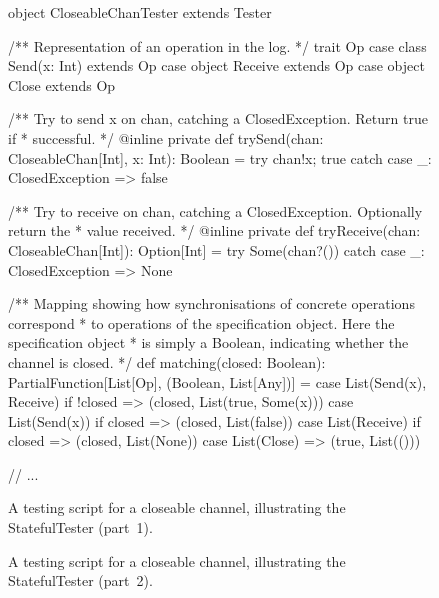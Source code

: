\begin{figure}
\begin{scala}
object CloseableChanTester extends Tester{
  /** Representation of an operation in the log. */
  trait Op
  case class Send(x: Int) extends Op
  case object Receive extends Op
  case object Close extends Op

  /** Try to send x on chan, catching a ClosedException.  Return true if
    * successful. */ 
  @inline private def trySend(chan: CloseableChan[Int], x: Int): Boolean = 
    try{ chan!x; true } catch { case _: ClosedException => false }

  /** Try to receive on chan, catching a ClosedException.  Optionally return the
    * value received. */ 
  @inline private def tryReceive(chan: CloseableChan[Int]): Option[Int] = 
    try{ Some(chan?()) } catch { case _: ClosedException => None }

  /** Mapping showing how synchronisations of concrete operations correspond 
    * to operations of the specification object.  Here the specification object
    * is simply a Boolean, indicating whether the channel is closed.  */
  def matching(closed: Boolean): PartialFunction[List[Op], (Boolean, List[Any])] = {
    case List(Send(x), Receive) if !closed => (closed, List(true, Some(x)))
    case List(Send(x)) if closed => (closed, List(false))
    case List(Receive) if closed => (closed, List(None))
    case List(Close) => (true, List(()))
  }

  // ...
}
\end{scala}
\caption{A testing script for a closeable channel, illustrating the {\scalashape
    Stateful\-Tester} (part~1).\label{fig:closable-chan-1}} 
\end{figure}


\begin{figure}
\caption{A testing script for a closeable channel, illustrating the {\scalashape
    Stateful\-Tester} (part~2).\label{fig:closable-chan-2}} 
\end{figure}

